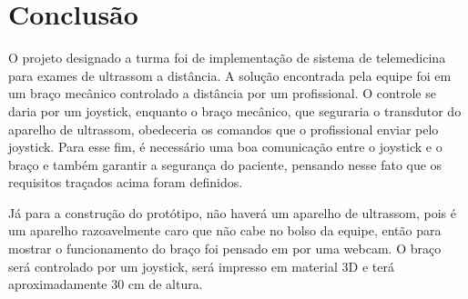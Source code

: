 \chapter{Conclusão}
O projeto designado a turma foi de implementação de sistema de telemedicina para exames de ultrassom a distância. A solução encontrada pela equipe foi em um braço mecânico controlado a distância por um profissional. O controle se daria por um joystick, enquanto o braço mecânico, que seguraria o transdutor do aparelho de ultrassom, obedeceria os comandos que o profissional enviar pelo joystick. Para esse fim, é necessário uma boa comunicação entre o joystick e o braço e também garantir a segurança do paciente, pensando nesse fato que os requisitos traçados acima foram definidos.

	Já para a construção do protótipo, não haverá um aparelho de ultrassom, pois é um aparelho razoavelmente caro que não cabe no bolso da equipe, então para mostrar o funcionamento do braço foi pensado em por uma webcam. O braço será controlado por um joystick, será impresso em material 3D e terá aproximadamente 30 cm de altura.
	
\nocite{inmetro2003}
\nocite{abesco1}
\nocite{aneel1}
\nocite{santos1}
\nocite{portalsol1}
\nocite{ultrasom1}
\nocite{bracomec}
\nocite{ultrasom2}
\nocite{mathiassen-frontiers2016}
\nocite{pierrot1999hippocrate}
\nocite{djangoframe}
\nocite{moreto2007controle}
\nocite{fanuc}
\nocite{maquinasele}